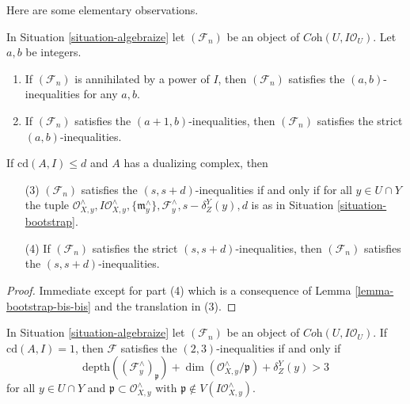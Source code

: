 \noindent
Here are some elementary observations.

\begin{lemma}
\label{lemma-elementary}
In Situation \ref{situation-algebraize} let $(\mathcal{F}_n)$ be an object
of $\textit{Coh}(U, I\mathcal{O}_U)$. Let $a, b$ be integers.
\begin{enumerate}
\item If $(\mathcal{F}_n)$ is annihilated by a power of $I$, then
$(\mathcal{F}_n)$ satisfies the $(a, b)$-inequalities for any $a, b$.
\item If $(\mathcal{F}_n)$ satisfies the $(a + 1, b)$-inequalities, then
$(\mathcal{F}_n)$ satisfies the strict $(a, b)$-inequalities.
\end{enumerate}
If $\text{cd}(A, I) \leq d$ and $A$ has a dualizing complex, then
\begin{enumerate}
\item[(3)] $(\mathcal{F}_n)$ satisfies the $(s, s + d)$-inequalities
if and only if for all $y \in U \cap Y$ the tuple
$\mathcal{O}_{X, y}^\wedge, I\mathcal{O}_{X, y}^\wedge,
\{\mathfrak m_y^\wedge\}, \mathcal{F}_y^\wedge, s - \delta^Y_Z(y), d$
is as in Situation \ref{situation-bootstrap}.
\item[(4)]
If $(\mathcal{F}_n)$ satisfies the strict $(s, s + d)$-inequalities, then
$(\mathcal{F}_n)$ satisfies the $(s, s + d)$-inequalities.
\end{enumerate}
\end{lemma}

\begin{proof}
Immediate except for part (4) which is a consequence of
Lemma \ref{lemma-bootstrap-bis-bis} and the translation in (3).
\end{proof}

\begin{lemma}
\label{lemma-explain-2-3-cd-1}
In Situation \ref{situation-algebraize} let $(\mathcal{F}_n)$ be an object
of $\textit{Coh}(U, I\mathcal{O}_U)$. If $\text{cd}(A, I) = 1$, then
$\mathcal{F}$ satisfies the $(2, 3)$-inequalities if and only if
$$
\text{depth}((\mathcal{F}^\wedge_y)_\mathfrak p) +
\dim(\mathcal{O}_{X, y}^\wedge/\mathfrak p) + \delta^Y_Z(y) > 3
$$
for all $y \in U \cap Y$ and $\mathfrak p \subset \mathcal{O}_{X, y}^\wedge$
with $\mathfrak p \not \in V(I\mathcal{O}_{X, y}^\wedge)$.
\end{lemma}

